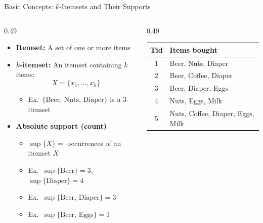 \documentclass[aspectratio=169, 11pt]{beamer}
\begin{document}
\begin{frame}{Basic Concepts: $k$-Itemsets and Their Supports}
    \begin{columns}[T]
        \begin{column}{0.49\textwidth}
            \small
            \begin{itemize}
                \item \textbf{Itemset:} A set of one or more items
                \item \textbf{$k$-itemset:} An itemset containing $k$ items:
                $$X = \{x_1, \dots, x_k\}$$
                \begin{itemize}
                    \item Ex.\ $\{\text{Beer, Nuts, Diaper}\}$ is a 3-itemset
                \end{itemize}
                \item \textbf{Absolute support (count)}
                \begin{itemize}
                    \item $\sup\{X\} =$ occurrences of an itemset $X$
                    \item Ex.\ $\sup\{\text{Beer}\} = 3$, $\sup\{\text{Diaper}\} = 4$
                    \item Ex.\ $\sup\{\text{Beer, Diaper}\} = 3$
                    \item Ex.\ $\sup\{\text{Beer, Eggs}\} = 1$
                \end{itemize}
            \end{itemize}
        \end{column}
        \begin{column}{0.49\textwidth}
            \centering
            \footnotesize
            \begin{tabular}{cl}
                \toprule
                \textbf{Tid} & \textbf{Items bought} \\
                \midrule
                1 & Beer, Nuts, Diaper \\
                2 & Beer, Coffee, Diaper \\
                3 & Beer, Diaper, Eggs \\
                4 & Nuts, Eggs, Milk \\
                5 & Nuts, Coffee, Diaper, Eggs, Milk \\
                \bottomrule
            \end{tabular}
            \vspace{4mm}
            \begin{itemize}

\end{itemize}
\end{column}
\end{columns}
\end{frame}
\end{document}
